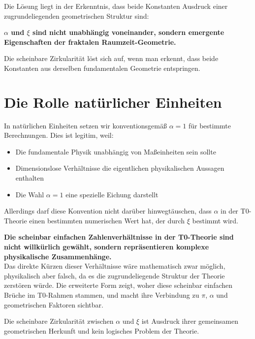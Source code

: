 Die Lösung liegt in der Erkenntnis, dass beide Konstanten Ausdruck einer zugrundeliegenden geometrischen Struktur sind:

\begin{tcolorbox}[colback=green!5!white,colframe=green!75!black]
	\textbf{$\alpha$ und $\xi$ sind nicht unabhängig voneinander, sondern emergente Eigenschaften der fraktalen Raumzeit-Geometrie.}
\end{tcolorbox}

Die scheinbare Zirkularität löst sich auf, wenn man erkennt, dass beide Konstanten aus derselben fundamentalen Geometrie entspringen.

\section{Die Rolle natürlicher Einheiten}
\label{sec:einheiten}

In natürlichen Einheiten setzen wir konventionsgemäß $\alpha = 1$ für bestimmte Berechnungen. Dies ist legitim, weil:

\begin{itemize}
	\item Die fundamentale Physik unabhängig von Maßeinheiten sein sollte
	\item Dimensionslose Verhältnisse die eigentlichen physikalischen Aussagen enthalten
	\item Die Wahl $\alpha = 1$ eine spezielle Eichung darstellt
\end{itemize}

Allerdings darf diese Konvention nicht darüber hinwegtäuschen, dass $\alpha$ in der T0-Theorie einen bestimmten numerischen Wert hat, der durch $\xi$ bestimmt wird.

\begin{tcolorbox}[colback=blue!5!white,colframe=blue!75!black]
	\textbf{Die scheinbar einfachen Zahlenverhältnisse in der T0-Theorie sind nicht willkürlich gewählt, sondern repräsentieren komplexe physikalische Zusammenhänge.} \\
	
	Das direkte Kürzen dieser Verhältnisse wäre mathematisch zwar möglich, physikalisch aber falsch, da es die zugrundeliegende Struktur der Theorie zerstören würde. Die erweiterte Form zeigt, woher diese scheinbar einfachen Brüche im T0-Rahmen stammen, und macht ihre Verbindung zu $\pi$, $\alpha$ und geometrischen Faktoren sichtbar.
	
	Die scheinbare Zirkularität zwischen $\alpha$ und $\xi$ ist Ausdruck ihrer gemeinsamen geometrischen Herkunft und kein logisches Problem der Theorie.
\end{tcolorbox}


